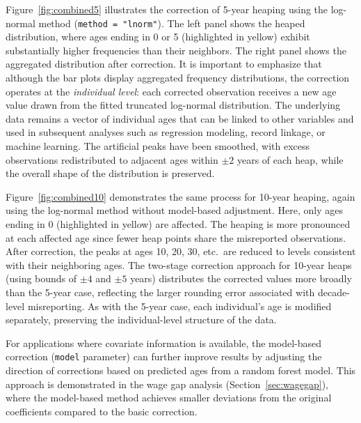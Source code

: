 \documentclass[12pt]{article}
\theoremstyle{plain}
\theoremstyle{definition}
\begin{document}
Figure~\ref{fig:combined5} illustrates the correction of 5-year heaping using the log-normal method (\texttt{method = "lnorm"}). The left panel shows the heaped distribution, where ages ending in 0 or 5 (highlighted in yellow) exhibit substantially higher frequencies than their neighbors. The right panel shows the aggregated distribution after correction. It is important to emphasize that although the bar plots display aggregated frequency distributions, the correction operates at the \emph{individual level}: each corrected observation receives a new age value drawn from the fitted truncated log-normal distribution. The underlying data remains a vector of individual ages that can be linked to other variables and used in subsequent analyses such as regression modeling, record linkage, or machine learning. The artificial peaks have been smoothed, with excess observations redistributed to adjacent ages within $\pm 2$ years of each heap, while the overall shape of the distribution is preserved.

Figure~\ref{fig:combined10} demonstrates the same process for 10-year heaping, again using the log-normal method without model-based adjustment. Here, only ages ending in 0 (highlighted in yellow) are affected. The heaping is more pronounced at each affected age since fewer heap points share the misreported observations. After correction, the peaks at ages 10, 20, 30, etc.\ are reduced to levels consistent with their neighboring ages. The two-stage correction approach for 10-year heaps (using bounds of $\pm 4$ and $\pm 5$ years) distributes the corrected values more broadly than the 5-year case, reflecting the larger rounding error associated with decade-level misreporting. As with the 5-year case, each individual's age is modified separately, preserving the individual-level structure of the data.

For applications where covariate information is available, the model-based correction (\texttt{model} parameter) can further improve results by adjusting the direction of corrections based on predicted ages from a random forest model. This approach is demonstrated in the wage gap analysis (Section~\ref{sec:wagegap}), where the model-based method achieves smaller deviations from the original coefficients compared to the basic correction.
\end{document}
